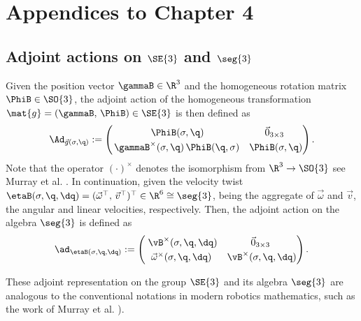 \chapter{Appendices to Chapter 4}
\section{Adjoint actions on $\SE{3}$ and $\seg{3}$} 
\label{app:C2:adjoint}  
\noindent Given the position vector $\gammaB \in \R^3$ and the homogeneous rotation matrix $\PhiB \in \SO{3}$, the adjoint action of the homogeneous transformation $\mat{g} = (\gammaB,\,\PhiB) \in \SE{3}$ is then defined as
%
\begin{equation}
\renewcommand*{\arraystretch}{1.25}{}
\Ad_{\vec{g}(\sigma,\q)} := \begin{pmatrix}
\; {\PhiB}(\sigma,\q) & \vec{0}_{3\times3} \; \\
\hspace{0.5mm} \gammaB^{\times}(\sigma,{\q})\,{\PhiB}({\q},\sigma) & {\PhiB}(\sigma,{\q})
\end{pmatrix}. 
\label{eq:C2:adjoint_matrix}
\end{equation}
%
Note that the operator $(\cdot)^\times$ denotes the isomorphism from $\R^3 \to \SO{3}$ see Murray et al. \cite{Murray1994}. In continuation, given the velocity twist $\etaB(\sigma,\q,\dq) = (\vec{\omega}^\top,\,\vec{v}^\top)^\top \in \R^6 \cong \seg{3}$, being the aggregate of $\vec{\omega}$ and $\vec{v}$, the angular and linear velocities, respectively. Then, the adjoint action on the algebra $\seg{3}$ is defined as
%
\begin{equation}
\renewcommand*{\arraystretch}{1.25}{}
\ad_{\etaB(\sigma,\q,\dq)} := \begin{pmatrix}
\; \vB^{\times}(\sigma,\q,\dq) & \vec{0}_{3\times3} \; \\
 \vec{\omega}^{\times}(\sigma,\q,\dq) & \vB^{\times} (\sigma,\q,\dq)
\end{pmatrix}. 
\label{eq:C2:adjoint_matrix_algebra}
\end{equation}
%

\noindent These adjoint representation on the group $\SE{3}$ and its algebra $\seg{3}$ are analogous to the conventional notations in modern robotics mathematics, such as the work of Murray et al. \cite{Murray1994}).


